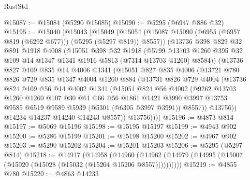 \begin{lexlean}{RustStd}
\begin{coremodule}
@15087 := @15084 (@5290 @15085)
@15090 := @5295 (@6947 @886 @32)
@15195 := @15040
    (@15043
      (@15049
        (@15054 (@15087 @15090 (@6955 (@6957 @819 (@6292 @677))) (@5295 (@5297 @819)) @8557))
        (@13736
          @398
          @829
          @32
          @891
          @1918
          @4008
          (@15051
            @398
            @32
            @1918
            (@5799
              @13703
              @1260
              @395
              @32
              @109
              @14
              @1347
              @1341
              @1916
              @5813
              (@7314 @13703 @1260)
              @8584))
          (@13736
            @827
            @109
            @835
            @14
            @4006
            @1341
            (@15051
              @827
              @835
              @4006
              (@13721
                @780
                @826
                @729
                @835
                @1347
                @4004
                @1260
                @884
                (@13731
                  @826
                  @729
                  @4004
                  (@13736
                    @824
                    @109
                    @56
                    @14
                    @4002
                    @1341
                    (@15051
                      @824
                      @56
                      @4002
                      (@9262
                        @13703
                        @1260
                        @1260
                        @107
                        @30
                        @61
                        @66
                        @56
                        @1861
                        @1421
                        @3990
                        @3997
                        @13753
                        @9585
                        @6519
                        @9589
                        @5939
                        (@5301 (@6305 @3997 @3991))
                        @8557))
                    @13756))
                @14234
                @14237
                @14240
                @14243
                @8557))
            @13756))))
@15196 := @4873 @814
@15197 := @5069 @15196
@15198 := @15195 @15197
@15199 := @4943 @902
@15200 := @5286 @15199
@15201 := @15198 @15200
@15202 := @4967 @902
@15203 := @5290 @15202
@15204 := @15201 @15203
@15206 := @5295 (@5297 @814)
@15218 := @14917
    (@14958
      (@14960 (@14962 (@14979 (@14995 (@15007 (@15020 (@15028 (@15032 (@15204 @15206 @8557))))))))))
@15219 := @4855 @780
@15220 := @4863 @14233

\end{coremodule}
\end{lexlean}
